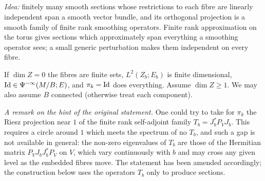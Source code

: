 \subsection*{}

\emph{Idea:} finitely many smooth sections whose restrictions to each fibre are
linearly independent span a smooth vector bundle, and its orthogonal projection is
a smooth family of finite rank smoothing operators. Finite rank approximation on
the torus gives sections which approximately span everything a smoothing operator
sees; a small generic perturbation makes them independent on every fibre.

If $\dim Z=0$ the fibres are finite sets, $L^2(Z_b;E_b)$ is finite dimensional,
$\operatorname{Id}\in\Psi^{-\infty}(M/B;E)$, and $\pi_k=\operatorname{Id}$ does everything. Assume $\dim Z\ge1$.
We may also assume $B$ connected (otherwise treat each component).

\emph{A remark on the hint of the original statement.} One could try to take for
$\pi_k$ the Riesz projection near $1$ of the finite rank self-adjoint family
$T_b=J_b^*P_VJ_b$. This requires a circle around $1$ which meets the spectrum of no
$T_b$, and such a gap is not available in general: the non-zero eigenvalues of
$T_b$ are those of the Hermitian matrix $P_VJ_bJ_b^*P_V$ on $V$, which vary
continuously with $b$ and may cross any given level as the embedded fibres move. The
statement has been amended accordingly; the construction below uses the operators
$T_b$ only to produce sections.

